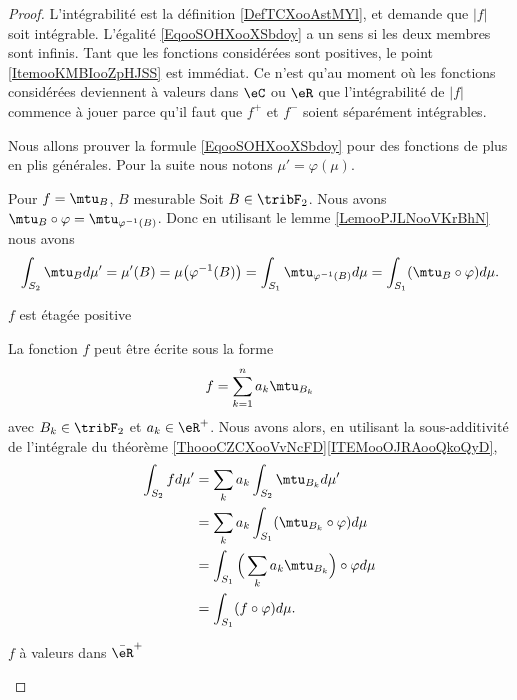 \begin{proof}
    L'intégrabilité est la définition \ref{DefTCXooAstMYl}, et demande que \( | f |\) soit intégrable. L'égalité \eqref{EqooSOHXooXSbdoy} a un sens si les deux membres sont infinis. Tant que les fonctions considérées sont positives, le point \ref{ItemooKMBIooZpHJSS} est immédiat. Ce n'est qu'au moment où les fonctions considérées deviennent à valeurs dans \( \eC\) ou \( \eR\) que l'intégrabilité de \( | f |\) commence à jouer parce qu'il faut que \(  f^+  \) et \( f^-\) soient séparément intégrables.

    Nous allons prouver la formule \eqref{EqooSOHXooXSbdoy} pour des fonctions de plus en plis générales. Pour la suite nous notons \( \mu'=\varphi(\mu)\).

    \begin{subproof}
        \item[Pour \( f=\mtu_B\), \( B \) mesurable]
            Soit \( B\in\tribF_2 \). Nous avons \( \mtu_B\circ\varphi=\mtu_{\varphi^{-1}(B)}\). Donc en utilisant le lemme \ref{LemooPJLNooVKrBhN} nous avons
            \begin{equation}
                \int_{S_2}\mtu_{B}d\mu'=\mu'(B)=\mu\big( \varphi^{-1}(B) \big)=\int_{S_1}\mtu_{\varphi^{-1}(B)}d\mu=\int_{S_1}(\mtu_B\circ \varphi)d\mu.
            \end{equation}
        \item[\( f\) est étagée positive]

            La fonction \( f\) peut être écrite sous la forme
            \begin{equation}
                f=\sum_{k=1}^na_k\mtu_{B_k}
            \end{equation}
            avec \( B_k\in\tribF_2\) et \( a_k\in \eR^+\). Nous avons alors, en utilisant la sous-additivité de l'intégrale du théorème \ref{ThoooCZCXooVvNcFD}\ref{ITEMooOJRAooQkoQyD},
            \begin{subequations}
                \begin{align}
                    \int_{S_2}fd\mu'&=\sum_ka_k\int_{S_2}\mtu_{B_k}d\mu'\\
                    &=\sum_ka_k\int_{S_1}(\mtu_{B_k}\circ\varphi)d\mu\\
                    &=\int_{S_1}\Big( \sum_ka_k\mtu_{B_k} \Big)\circ \varphi d\mu\\
                    &=\int_{S_1}(f\circ\varphi)d\mu.
                \end{align}
            \end{subequations}
        \item[\( f\) à valeurs dans \( \bar \eR^+\)]


\end{subproof}
\end{proof}
